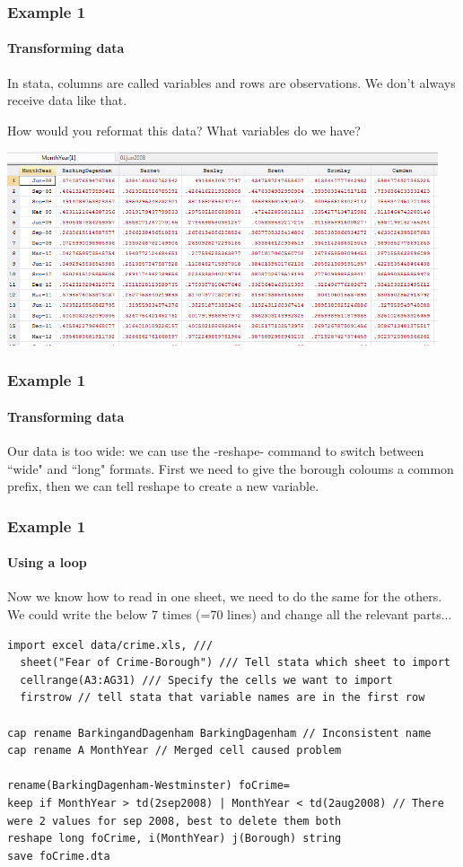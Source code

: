 \documentclass{beamer}
\begin{document}
\begin{frame}
  \frametitle{Example 1}
  \framesubtitle{Transforming data}
In stata, columns are called variables and rows are observations. We don't always receive data like that.

\smallskip

How would you reformat this data? What variables do we have?

\includegraphics[width=5in]{data.PNG}
\end{frame}


\begin{frame}
  \frametitle{Example 1}
  \framesubtitle{Transforming data}
Our data is too wide: we can use the -reshape- command to switch between ``wide" and ``long" formats. First we need to give the borough coloums a common prefix, then we can tell reshape to create a new variable. 




\end{frame}

\begin{frame}[fragile]
  \frametitle{Example 1}
  \framesubtitle{Using a loop}

Now we know how to read in one sheet, we need to do the same for the others. We could write the below 7 times  (=70 lines) and change all the relevant parts...

\scriptsize
\begin{verbatim}
import excel data/crime.xls, ///
  sheet("Fear of Crime-Borough") /// Tell stata which sheet to import
  cellrange(A3:AG31) /// Specify the cells we want to import
  firstrow // tell stata that variable names are in the first row
	
cap rename BarkingandDagenham BarkingDagenham // Inconsistent name
cap rename A MonthYear // Merged cell caused problem

rename(BarkingDagenham-Westminster) foCrime=
keep if MonthYear > td(2sep2008) | MonthYear < td(2aug2008) // There were 2 values for sep 2008, best to delete them both
reshape long foCrime, i(MonthYear) j(Borough) string
save foCrime.dta
\end{verbatim}

\end{frame}
\end{document}
